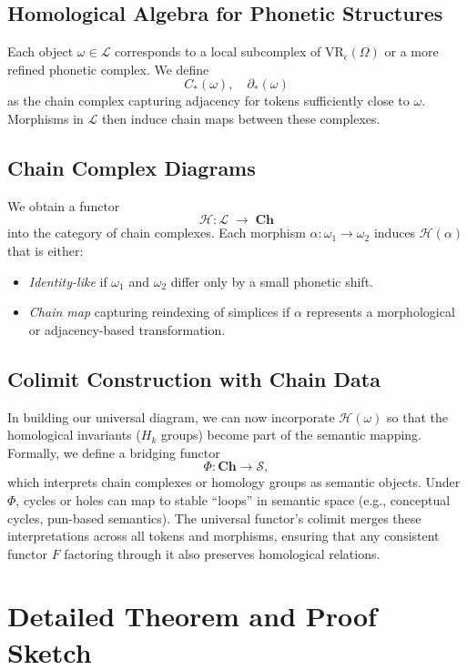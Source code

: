 \documentclass[11pt]{article}
\theoremstyle{definition}
\theoremstyle{remark}
\begin{document}
\subsection{Homological Algebra for Phonetic Structures}
Each object \(\omega\in\mathcal{L}\) corresponds to a local subcomplex of \(\mathrm{VR}_\epsilon(\Omega)\) or a more refined phonetic complex. We define
\[
C_\ast(\omega), \quad \partial_\ast(\omega)
\]
as the chain complex capturing adjacency for tokens sufficiently close to \(\omega\). Morphisms in \(\mathcal{L}\) then induce chain maps between these complexes.

\subsection{Chain Complex Diagrams}
We obtain a functor 
\[
\mathcal{H}: \mathcal{L} \;\to\; \mathbf{Ch}
\]
into the category of chain complexes. Each morphism \(\alpha:\omega_1\to\omega_2\) induces \(\mathcal{H}(\alpha)\) that is either:
\begin{itemize}
    \item \emph{Identity-like} if \(\omega_1\) and \(\omega_2\) differ only by a small phonetic shift.
    \item \emph{Chain map} capturing reindexing of simplices if \(\alpha\) represents a morphological or adjacency-based transformation.
\end{itemize}

\subsection{Colimit Construction with Chain Data}
In building our universal diagram, we can now incorporate \(\mathcal{H}(\omega)\) so that the homological invariants (\(H_k\) groups) become part of the semantic mapping. Formally, we define a bridging functor
\[
\Phi: \mathbf{Ch} \longrightarrow \mathcal{S},
\]
which interprets chain complexes or homology groups as semantic objects. Under \(\Phi\), cycles or holes can map to stable “loops” in semantic space (e.g., conceptual cycles, pun-based semantics). The universal functor’s colimit merges these interpretations across all tokens and morphisms, ensuring that any consistent functor \(F\) factoring through it also preserves homological relations.

\section{Detailed Theorem and Proof Sketch}
\label{sec:detailed-theorem}
\end{document}
